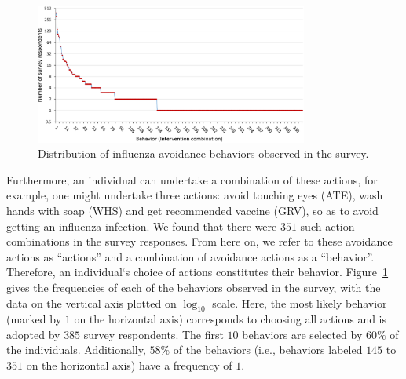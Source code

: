\documentclass[doublespace]{VTthesis}
\begin{document}
    \begin{figure}[H]
    \centering
    \includegraphics[width=0.8\textwidth]{figures/uniquevectors.png}
    \caption{Distribution of influenza avoidance behaviors observed in the survey.}
    \label{fig:avoidancedist}
    \end{figure}
	Furthermore, an individual can undertake a combination of these actions, for example, one might undertake three actions: avoid touching eyes (ATE), wash hands with soap (WHS) and get recommended vaccine (GRV), so as to avoid getting an influenza infection. We found that there were $351$ such action combinations in the survey responses. From here on, we refer to these avoidance actions as ``actions'' and a combination of avoidance actions as a ``behavior''. Therefore, an individual`s choice of actions constitutes their behavior. Figure~\ref{fig:avoidancedist} gives the frequencies of each of the behaviors observed in the survey, with the data on the vertical axis plotted on $\log_{10}$ scale. Here, the most likely behavior (marked by $1$ on the horizontal axis) corresponds to choosing all actions and is adopted by $385$ survey respondents. The first $10$ behaviors are selected by $60\%$ of the individuals. Additionally, $58\%$ of the behaviors (i.e., behaviors labeled $145$ to $351$ on the horizontal axis) have a frequency of $1$.
    
	
\end{document}
